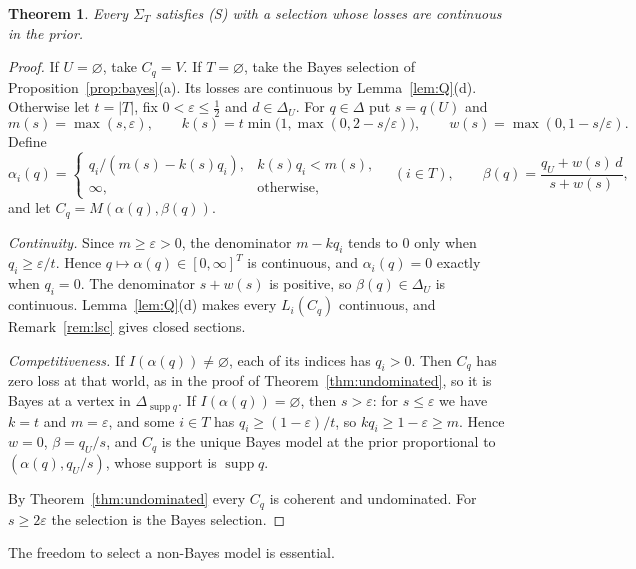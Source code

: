 \documentclass[11pt]{article}
\newtheorem{theorem}{Theorem}
\theoremstyle{remark}\newtheorem{remark}[theorem]{Remark}
\newcommand{\supp}{\operatorname{supp}}
\begin{document}
\begin{theorem}\label{thm:S}
Every $\Sigma_T$ satisfies (S) with a selection whose losses are
continuous in the prior.
\end{theorem}
\begin{proof}
If $U=\varnothing$, take $C_q=V$. If $T=\varnothing$, take the Bayes
selection of Proposition~\ref{prop:bayes}(a). Its losses are continuous by
Lemma~\ref{lem:Q}(d). Otherwise let $t=|T|$, fix $0<\varepsilon\le\tfrac12$
and $d\in\Delta_U$. For $q\in\Delta$ put $s=q(U)$ and
\[
 m(s)=\max(s,\varepsilon),\qquad
 k(s)=t\min\bigl(1,\max(0,2-s/\varepsilon)\bigr),\qquad
 w(s)=\max(0,1-s/\varepsilon).
\]
Define
\[
 \alpha_i(q)=
 \begin{cases}
 q_i/(m(s)-k(s)q_i),& k(s)q_i<m(s),\\
 \infty,&\text{otherwise},
 \end{cases}
 \quad(i\in T),\qquad
 \beta(q)=\frac{q_U+w(s)\,d}{s+w(s)},
\]
and let $C_q=M(\alpha(q),\beta(q))$.

\emph{Continuity.} Since $m\ge\varepsilon>0$, the denominator
$m-kq_i$ tends to $0$ only when $q_i\ge\varepsilon/t$. Hence
$q\mapsto\alpha(q)\in[0,\infty]^T$ is continuous, and $\alpha_i(q)=0$
exactly when $q_i=0$. The denominator $s+w(s)$ is positive, so
$\beta(q)\in\Delta_U$ is continuous. Lemma~\ref{lem:Q}(d) makes every
$L_i(C_q)$ continuous, and Remark~\ref{rem:lsc} gives closed sections.

\emph{Competitiveness.} If $I(\alpha(q))\ne\varnothing$, each of its
indices has $q_i>0$. Then $C_q$ has zero loss at that world, as in the
proof of Theorem~\ref{thm:undominated}, so it is Bayes at a vertex in
$\Delta_{\supp q}$. If $I(\alpha(q))=\varnothing$, then $s>\varepsilon$:
for $s\le\varepsilon$ we have $k=t$ and $m=\varepsilon$, and some $i\in T$
has $q_i\ge(1-\varepsilon)/t$, so $kq_i\ge1-\varepsilon\ge m$. Hence $w=0$,
$\beta=q_U/s$, and $C_q$ is the unique Bayes model at the prior
proportional to $(\alpha(q),q_U/s)$, whose support is $\supp q$.

By Theorem~\ref{thm:undominated} every $C_q$ is coherent and undominated.
For $s\ge2\varepsilon$ the selection is the Bayes selection.
\end{proof}

The freedom to select a non-Bayes model is essential.
\end{document}
